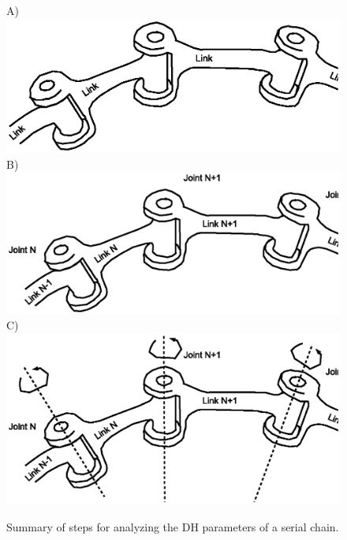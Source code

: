 \begin{figure}[p]
\centering
A)\includegraphics[width=5.0in]{figs03/linkdiag_plain.eps}\\
B)\includegraphics[width=5.0in]{figs03/linkdiag_idlinksjoints.eps}\\
C)\includegraphics[width=5.0in]{figs03/linkdiag_idaxestypes.eps}
\caption{Summary of steps for analyzing the DH parameters of a serial chain.}\label{DHStepsSummary}
\end{figure}
